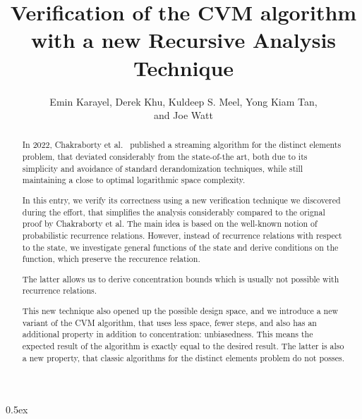\documentclass[11pt,a4paper]{article}
\begin{document}
\title{Verification of the CVM algorithm with a new Recursive Analysis Technique}
\author{Emin Karayel, Derek Khu, Kuldeep S. Meel, Yong Kiam Tan,\\and Joe Watt}
\maketitle

\begin{abstract}
In 2022, Chakraborty et al.~\cite{chakraborty2022} published a streaming algorithm for the distinct
elements problem, that deviated considerably from the state-of-the art, both due to its simplicity
and avoidance of standard derandomization techniques, while still maintaining a close to optimal
logarithmic space complexity.

In this entry, we verify its correctness using a new verification technique we discovered during the
effort, that simplifies the analysis considerably compared to the orignal proof by Chakraborty et
al. The main idea is based on the well-known notion of probabilistic recurrence relations. However,
instead of recurrence relations with respect to the state, we investigate general functions of the
state and derive conditions on the function, which preserve the reccurence relation.

The latter allows us to derive concentration bounds which is usually not possible with 
recurrence relations.

This new technique also opened up the possible design space, and we introduce a new variant of the 
CVM algorithm, that uses less space, fewer steps, and also has an additional property in addition 
to concentration: unbiasedness. This means the expected result of the algorithm is exactly equal to
the desired result. The latter is also a new property, that classic algorithms for the distinct
elements problem do not posses.
\end{abstract}

\tableofcontents

\parindent 0pt\parskip 0.5ex





\end{document}
